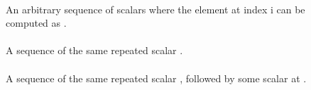 \begin{figure}
  \small
  \raggedright

\newcommand{\loopletscale}{0.8}

\begin{minipage}{0.7\linewidth}
  \paragraph{}

  An arbitrary sequence of scalars where the element at index i can be computed
  as .
\end{minipage}\hspace{8pt}%
\begin{minipage}{0.3\linewidth - 8pt}

\end{minipage}

\begin{minipage}{0.7\linewidth}
  \paragraph{}

  A sequence of the same repeated scalar .
\end{minipage}\hspace{8pt}%
\begin{minipage}{0.3\linewidth - 8pt}

\end{minipage}

\begin{minipage}{0.7\linewidth}
  \paragraph{}

  A sequence of the same repeated scalar , followed by some
  scalar  at .
\end{minipage}\hspace{8pt}%
\begin{minipage}{0.3\linewidth - 8pt}

\end{minipage}

  \paragraph{}


\end{figure}
